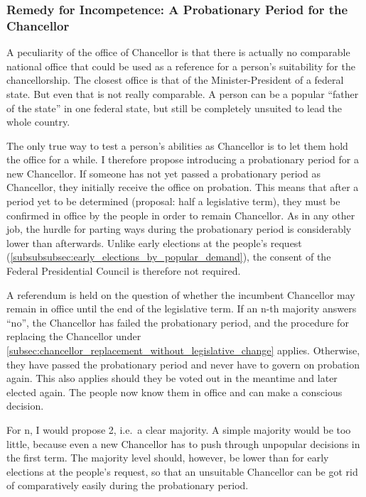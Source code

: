 \subsubsection{Remedy for Incompetence: A Probationary Period for the Chancellor}\label{subsubsec:probation}
A peculiarity of the office of Chancellor is that there is actually no comparable national office that could be used as a reference for a person's suitability for the chancellorship.
The closest office is that of the Minister-President of a federal state.
But even that is not really comparable.
A person can be a popular \enquote{father of the state} in one federal state, but still be completely unsuited to lead the whole country.

The only true way to test a person's abilities as Chancellor is to let them hold the office for a while.
I therefore propose introducing a probationary period for a new Chancellor.
If someone has not yet passed a probationary period as Chancellor, they initially receive the office on probation.
This means that after a period yet to be determined (proposal: half a legislative term), they must be confirmed in office by the people in order to remain Chancellor.
As in any other job, the hurdle for parting ways during the probationary period is considerably lower than afterwards.
Unlike early elections at the people's request (\cref{subsubsubsec:early_elections_by_popular_demand}), the consent of the Federal Presidential Council is therefore not required.

A referendum is held on the question of whether the incumbent Chancellor may remain in office until the end of the legislative term.
If an n-th majority answers \enquote{no}, the Chancellor has failed the probationary period, and the procedure for replacing the Chancellor under \cref{subsec:chancellor_replacement_without_legislative_change} applies.
Otherwise, they have passed the probationary period and never have to govern on probation again.
This also applies should they be voted out in the meantime and later elected again.
The people now know them in office and can make a conscious decision.

For n, I would propose 2, i.e.\ a clear majority.
A simple majority would be too little, because even a new Chancellor has to push through unpopular decisions in the first term.
The majority level should, however, be lower than for early elections at the people's request, so that an unsuitable Chancellor can be got rid of comparatively easily during the probationary period.

